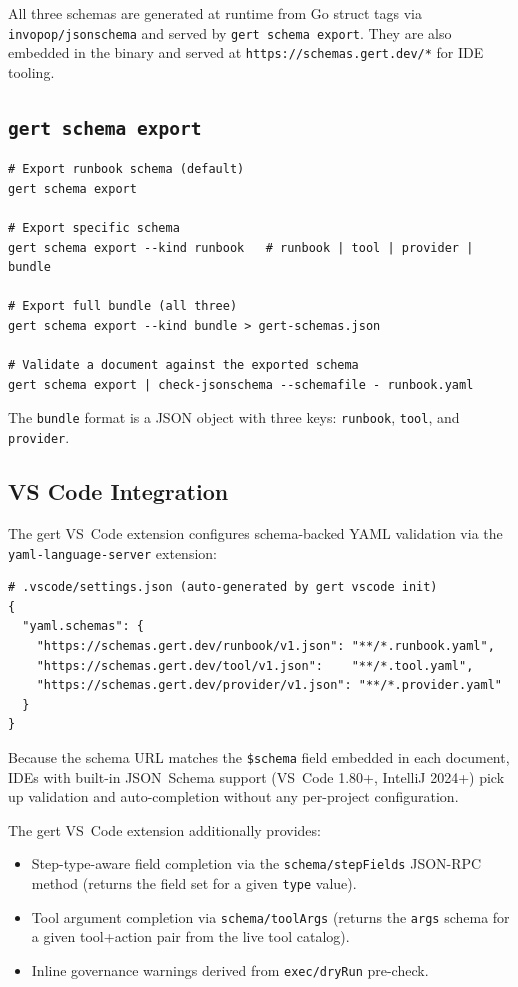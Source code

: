 All three schemas are generated at runtime from Go struct tags via
\texttt{invopop/jsonschema} and served by \texttt{gert schema export}.
They are also embedded in the binary and served at
\texttt{https://schemas.gert.dev/*} for IDE tooling.

\subsection{\texttt{gert schema export}}

\begin{verbatim}
# Export runbook schema (default)
gert schema export

# Export specific schema
gert schema export --kind runbook   # runbook | tool | provider | bundle

# Export full bundle (all three)
gert schema export --kind bundle > gert-schemas.json

# Validate a document against the exported schema
gert schema export | check-jsonschema --schemafile - runbook.yaml
\end{verbatim}

The \texttt{bundle} format is a JSON object with three keys:
\texttt{runbook}, \texttt{tool}, and \texttt{provider}.

\subsection{VS Code Integration}

The gert VS~Code extension configures schema-backed YAML validation via the
\texttt{yaml-language-server} extension:

\begin{verbatim}
# .vscode/settings.json (auto-generated by gert vscode init)
{
  "yaml.schemas": {
    "https://schemas.gert.dev/runbook/v1.json": "**/*.runbook.yaml",
    "https://schemas.gert.dev/tool/v1.json":    "**/*.tool.yaml",
    "https://schemas.gert.dev/provider/v1.json": "**/*.provider.yaml"
  }
}
\end{verbatim}

Because the schema URL matches the \texttt{\$schema} field embedded in each
document, IDEs with built-in JSON~Schema support (VS~Code 1.80+, IntelliJ 2024+)
pick up validation and auto-completion without any per-project configuration.

The gert VS~Code extension additionally provides:
\begin{itemize}
  \item Step-type-aware field completion via the \texttt{schema/stepFields}
        JSON-RPC method (returns the field set for a given \texttt{type} value).
  \item Tool argument completion via \texttt{schema/toolArgs} (returns the
        \texttt{args} schema for a given tool+action pair from the live tool
        catalog).
  \item Inline governance warnings derived from \texttt{exec/dryRun} pre-check.
\end{itemize}

